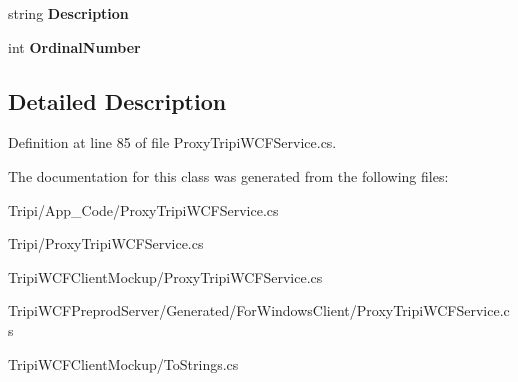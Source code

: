 \begin{DoxyCompactItemize}
\item 
\hypertarget{class_tripi_w_c_f_1_1_client_mockup_1_1_proxy_1_1_position_node_a2de15e5b9d17882dc0c57a73a3e19a03}{
string {\bfseries Description}}
\label{class_tripi_w_c_f_1_1_client_mockup_1_1_proxy_1_1_position_node_a2de15e5b9d17882dc0c57a73a3e19a03}

\item 
\hypertarget{class_tripi_w_c_f_1_1_client_mockup_1_1_proxy_1_1_position_node_a76bd3433903f76dd48067a1733857c4d}{
int {\bfseries OrdinalNumber}}
\label{class_tripi_w_c_f_1_1_client_mockup_1_1_proxy_1_1_position_node_a76bd3433903f76dd48067a1733857c4d}

\end{DoxyCompactItemize}


\subsection{Detailed Description}


Definition at line 85 of file ProxyTripiWCFService.cs.

The documentation for this class was generated from the following files:\begin{DoxyCompactItemize}
\item 
Tripi/App\_\-Code/ProxyTripiWCFService.cs\item 
Tripi/ProxyTripiWCFService.cs\item 
TripiWCFClientMockup/ProxyTripiWCFService.cs\item 
TripiWCFPreprodServer/Generated/ForWindowsClient/ProxyTripiWCFService.cs\item 
TripiWCFClientMockup/ToStrings.cs\end{DoxyCompactItemize}
